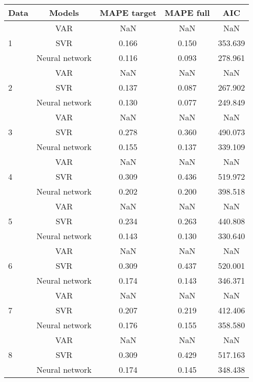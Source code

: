 \documentclass[12pt]{article}
\begin{document}
\begin{longtable}{|p{2cm}|c|c|c|c|}
\hline
Data & Models &MAPE target & MAPE full & AIC\\
\hline
\multirow{3}{*}{1} &VAR &   NaN &    NaN &    NaN\\
\cline{2-5}
 &SVR &   0.166 &    0.150 &    353.639\\
\cline{2-5}
 &Neural network &   0.116 &    0.093 &    278.961\\
\cline{2-5}
\hline
\multirow{3}{*}{2} &VAR &   NaN &    NaN &    NaN\\
\cline{2-5}
 &SVR &   0.137 &    0.087 &    267.902\\
\cline{2-5}
 &Neural network &   0.130 &    0.077 &    249.849\\
\cline{2-5}
\hline
\multirow{3}{*}{3} &VAR &   NaN &    NaN &    NaN\\
\cline{2-5}
 &SVR &   0.278 &    0.360 &    490.073\\
\cline{2-5}
 &Neural network &   0.155 &    0.137 &    339.109\\
\cline{2-5}
\hline
\multirow{3}{*}{4} &VAR &   NaN &    NaN &    NaN\\
\cline{2-5}
 &SVR &   0.309 &    0.436 &    519.972\\
\cline{2-5}
 &Neural network &   0.202 &    0.200 &    398.518\\
\cline{2-5}
\hline
\multirow{3}{*}{5} &VAR &   NaN &    NaN &    NaN\\
\cline{2-5}
 &SVR &   0.234 &    0.263 &    440.808\\
\cline{2-5}
 &Neural network &   0.143 &    0.130 &    330.640\\
\cline{2-5}
\hline
\multirow{3}{*}{6} &VAR &   NaN &    NaN &    NaN\\
\cline{2-5}
 &SVR &   0.309 &    0.437 &    520.001\\
\cline{2-5}
 &Neural network &   0.174 &    0.143 &    346.371\\
\cline{2-5}
\hline
\multirow{3}{*}{7} &VAR &   NaN &    NaN &    NaN\\
\cline{2-5}
 &SVR &   0.207 &    0.219 &    412.406\\
\cline{2-5}
 &Neural network &   0.176 &    0.155 &    358.580\\
\cline{2-5}
\hline
\multirow{3}{*}{8} &VAR &   NaN &    NaN &    NaN\\
\cline{2-5}
 &SVR &   0.309 &    0.429 &    517.163\\
\cline{2-5}
 &Neural network &   0.174 &    0.145 &    348.438\\

\end{longtable}
\end{document}
